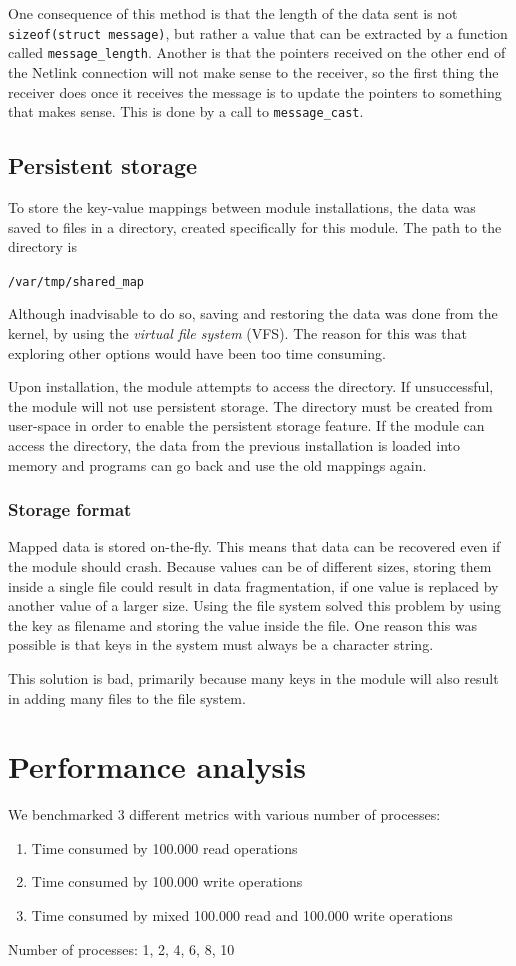 \documentclass[final,a4paper]{article}
\begin{document}
One consequence of this method is that the length of the data sent is not
\texttt{sizeof(struct message)}, but rather a value that can be extracted by a
function called \texttt{message\_length}. Another is that the pointers received
on the other end of the Netlink connection will not make sense to the receiver,
so the first thing the receiver does once it receives the message is to update
the pointers to something that makes sense. This is done by a call to
\texttt{message\_cast}.

\subsection{Persistent storage}
To store the key-value mappings between module installations, the data was
saved to files in a directory, created specifically for this module. The path
to the directory is
\begin{center}
\texttt{/var/tmp/shared\_map}
\end{center}
Although inadvisable to do so, saving and restoring the data was done from
the kernel, by using the \emph{virtual file system} (VFS). The reason for this
was that exploring other options would have been too time consuming.

Upon installation, the module attempts to access the directory. If unsuccessful,
the module will not use persistent storage. The directory must be created from
user-space in order to enable the persistent storage feature. If the module can
access the directory, the data from the previous installation is loaded into
memory and programs can go back and use the old mappings again.

\subsubsection*{Storage format}
Mapped data is stored on-the-fly. This means that data can be recovered even
if the module should crash. Because values can be of different sizes, storing
them inside a single file could result in data fragmentation, if one value
is replaced by another value of a larger size. Using the file system solved this
problem by using the key as filename and storing the value inside the file. One
reason this was possible is that keys in the system must  always be a character
string.

This solution is bad, primarily because many keys in the module will also result
in adding many files to the file system.

\section{Performance analysis}
We benchmarked 3 different metrics with various number of processes:
\begin{enumerate}
  \setlength\itemsep{-0.5em}
  \item Time consumed by 100.000 read operations
  \item Time consumed by 100.000 write operations
  \item Time consumed by mixed 100.000 read and 100.000 write operations
\end{enumerate}
Number of processes: 1, 2, 4, 6, 8, 10
\end{document}
